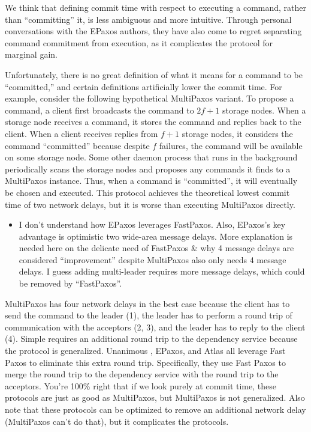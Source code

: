 \documentclass[letterpaper,twocolumn,10pt]{article}
\newenvironment{reviewerquote}
{\list{}{\leftmargin=\parindent\rightmargin=0in}\item[] \itshape \color{ReviewerDarkGray}}%
{\endlist}
\begin{document}
We think that defining commit time with respect to executing a command, rather
than ``committing'' it, is less ambiguous and more intuitive. Through personal
conversations with the EPaxos authors, they have also come to regret separating
command commitment from execution, as it complicates the protocol for marginal
gain.

Unfortunately, there is no great definition of what it means for a command to
be ``committed,'' and certain definitions artificially lower the commit time.
%
For example, consider the following hypothetical MultiPaxos variant. To propose
a command, a client first broadcasts the command to $2f+1$ storage nodes. When
a storage node receives a command, it stores the command and replies back to
the client. When a client receives replies from $f+1$ storage nodes, it
considers the command ``committed'' because despite $f$ failures, the command
will be available on some storage node. Some other daemon process that runs in
the background periodically scans the storage nodes and proposes any commands
it finds to a MultiPaxos instance. Thus, when a command is ``committed'', it
will eventually be chosen and executed. This protocol achieves the theoretical
lowest commit time of two network delays, but it is worse than executing
MultiPaxos directly.

\begin{reviewerquote}
  \begin{itemize}
    \item
      I don't understand how EPaxos leverages FastPaxos. Also, EPaxos's key
      advantage is optimistic two wide-area message delays. More explanation is
      needed here on the delicate need of FastPaxos \& why 4 message delays are
      considered ``improvement'' despite MultiPaxos also only needs 4 message
      delays. I guess adding multi-leader requires more message delays, which
      could be removed by ``FastPaxos''.
  \end{itemize}
\end{reviewerquote}

MultiPaxos has four network delays in the best case because the client has to
send the command to the leader (1), the leader has to perform a round trip of
communication with the acceptors (2, 3), and the leader has to reply to the
client (4). Simple \BPaxos{} requires an additional round trip to the
dependency service because the protocol is generalized. Unanimous \BPaxos{},
EPaxos, and Atlas all leverage Fast Paxos to eliminate this extra round trip.
Specifically, they use Fast Paxos to merge the round trip to the dependency
service with the round trip to the acceptors. You're 100\% right that if we
look purely at commit time, these protocols are just as good as MultiPaxos, but
MultiPaxos is not generalized. Also note that these protocols can be optimized
to remove an additional network delay (MultiPaxos can't do that), but it
complicates the protocols.
\end{document}
